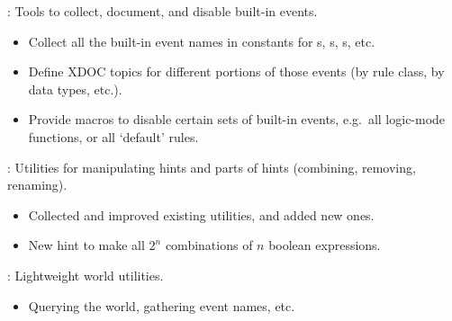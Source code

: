 
\begin{frame}

\newlibtitle

:
Tools to collect, document, and disable built-in events.
\begin{itemize}
\item Collect all the built-in event names in constants for
      s, s, s, etc.
\item Define XDOC topics for different portions of those events
      (by rule class, by data types, etc.).
\item Provide macros to disable certain sets of built-in events,
      e.g.\ all logic-mode functions, or all `default' rules.
\end{itemize}

\end{frame}


\begin{frame}

\newlibtitle

:
Utilities for manipulating hints and parts of hints (combining, removing, renaming).
\begin{itemize}
\item Collected and improved existing utilities, and added new ones.
\item New  hint to make all $2^n$ combinations of $n$ boolean expressions.
\end{itemize}

\end{frame}


\begin{frame}

\newlibtitle

:
Lightweight world utilities.
\begin{itemize}
\item Querying the world, gathering event names, etc.
\end{itemize}

\end{frame}

